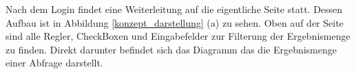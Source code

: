 Nach dem Login findet eine Weiterleitung auf die eigentliche Seite statt. Dessen Aufbau ist in Abbildung \ref{konzept_darstellung} (a) zu sehen. Oben auf der Seite sind alle Regler, CheckBoxen und Eingabefelder zur Filterung der Ergebnismenge zu finden. Direkt darunter befindet sich das Diagramm das die Ergebnismenge einer Abfrage darstellt.

\begin{figure}[htbp]
\hfill
{}\hfill
{}\hfill
{}\hfill

\end{figure}
